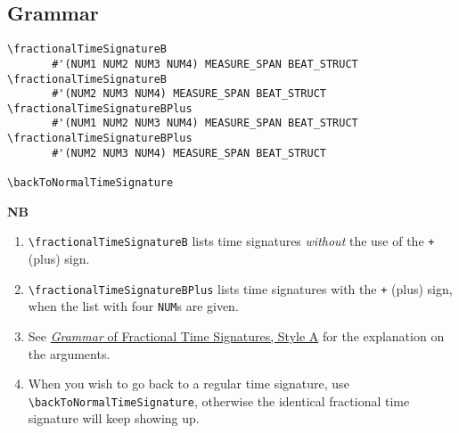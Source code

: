 \subsection{Grammar}
\begin{verbatim}
\fractionalTimeSignatureB 
       #'(NUM1 NUM2 NUM3 NUM4) MEASURE_SPAN BEAT_STRUCT
\fractionalTimeSignatureB
       #'(NUM2 NUM3 NUM4) MEASURE_SPAN BEAT_STRUCT
\fractionalTimeSignatureBPlus 
       #'(NUM1 NUM2 NUM3 NUM4) MEASURE_SPAN BEAT_STRUCT
\fractionalTimeSignatureBPlus 
       #'(NUM2 NUM3 NUM4) MEASURE_SPAN BEAT_STRUCT
       
\backToNormalTimeSignature

\end{verbatim}
\textbf{NB} 
\begin{enumerate}
\item \verb|\fractionalTimeSignatureB| lists time signatures \textit{without} the use of the \verb|+| (plus) sign. 
\item \verb|\fractionalTimeSignatureBPlus| lists time signatures with the \verb|+| (plus) sign, when the list with four \verb|NUM|s are given.
\item See \hyperref[sec:time_signatures_styleA_convention]{\textit{Grammar} of Fractional Time Signatures, Style A} for the explanation on the arguments.
\item When you wish to go back to a regular time signature, use \verb|\backToNormalTimeSignature|, otherwise the identical fractional time signature will keep showing up.
\end{enumerate}

